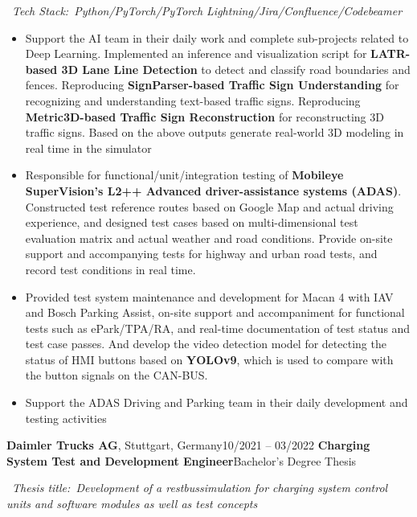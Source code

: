 \documentclass{resume}
\begin{document}
\ \textit{Tech Stack:\ Python/PyTorch/PyTorch Lightning/Jira/Confluence/Codebeamer}
\begin{itemize}
  \item Support the AI team in their daily work and complete sub-projects related to Deep Learning. Implemented an inference and visualization script for \textbf{LATR-based 3D Lane Line Detection} to detect and classify road boundaries and fences. Reproducing \textbf{SignParser-based Traffic Sign Understanding} for recognizing and understanding text-based traffic signs. Reproducing \textbf{Metric3D-based Traffic Sign Reconstruction} for reconstructing 3D traffic signs. Based on the above outputs generate real-world 3D modeling in real time in the simulator
  \item Responsible for functional/unit/integration testing of \textbf{Mobileye SuperVision's L2++ Advanced driver-assistance systems (ADAS)}. Constructed test reference routes based on Google Map and actual driving experience, and designed test cases based on multi-dimensional test evaluation matrix and actual weather and road conditions. Provide on-site support and accompanying tests for highway and urban road tests, and record test conditions in real time.
  \item Provided test system maintenance and development for Macan 4 with IAV and Bosch Parking Assist, on-site support and accompaniment for functional tests such as ePark/TPA/RA, and real-time documentation of test status and test case passes. And develop the video detection model for detecting the status of HMI buttons based on \textbf{YOLOv9}, which is used to compare with the button signals on the CAN-BUS.
  \item Support the ADAS Driving and Parking team in their daily development and testing activities
\end{itemize}
\vspace{0.15cm}

\worksubsection
  {\textbf{Daimler Trucks AG}, Stuttgart, Germany}{10/2021 -- 03/2022}
\workpossubsection
  {\textbf{Charging System Test and Development Engineer}}{Bachelor's Degree Thesis}

\ \textit{Thesis title:\ Development of a restbussimulation for charging system control units and software modules as well as test concepts}
\end{document}
